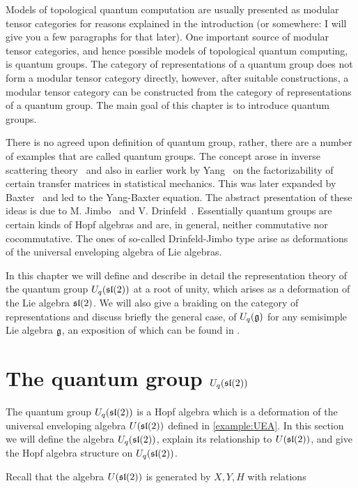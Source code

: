 Models of topological quantum computation are usually presented as modular
tensor categories for reasons explained in the introduction (or somewhere: I
will give you a few paragraphs for that later).  One important source
of modular tensor categories, and hence possible models of topological quantum
computing, is quantum groups.  The category of representations of a quantum
group does not form a modular tensor category directly, however, after suitable
constructions, a modular tensor category can be constructed from the category
of representations of a quantum group.  The main goal of this chapter is to
introduce quantum groups.

There is no agreed upon definition of quantum group, rather, there are a
number of examples that are called quantum groups.  The concept arose in
inverse scattering theory~\cite{Faddeev79} and also in earlier work by
Yang~\cite{Yang67} on the factorizability of certain transfer matrices in
statistical mechanics.  This was later expanded by Baxter~\cite{Baxter82}
and led to the Yang-Baxter equation.  The abstract presentation of these
ideas is due to M. Jimbo~\cite{Jimbo85} and V. Drinfeld~\cite{Drinfeld86}.
Essentially quantum groups are certain kinds of Hopf algebras and are, in
general, neither commutative nor cocommutative.  The ones of so-called
Drinfeld-Jimbo type arise as deformations of the universal enveloping
algebra of Lie algebras.

In this chapter we will define and describe in detail the representation theory
of the quantum group $U_q(\mathfrak{sl}(2))$ at a root of unity, which arises as a
deformation of the Lie algebra $\mathfrak{sl}(2)$. We will also give a braiding on the
category of representations and discuss briefly the general case, of
$U_q(\mathfrak{g})$ for any semisimple Lie algebra $\mathfrak{g}$, an exposition of which
can be found in \cite{CP}.

\section{The quantum group $U_q(\mathfrak{sl}(2))$}
\label{UqSL2}


The quantum group $U_q(\mathfrak{sl}(2))$ is a Hopf algebra which is a deformation of the
universal enveloping algebra $U(\mathfrak{sl}(2))$ defined in \ref{example:UEA}.  In this
section we will define the algebra $U_q(\mathfrak{sl}(2))$, explain its relationship to 
$U(\mathfrak{sl}(2))$, and give the Hopf algebra structure on $U_q(\mathfrak{sl}(2))$.

Recall that the algebra $U(\mathfrak{sl}(2))$ is generated by $X,Y,H$ with relations

